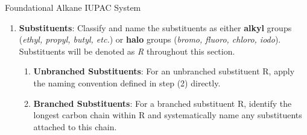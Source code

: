 \documentclass[10pt]{article}
\begin{document}
\begin{core}[label=core:alkane_iupac]{Foundational Alkane IUPAC System}
\begin{enumerate}[label=(\arabic*)]
          In \autoref{fig:iupac_1}, the longest chain contains 6 carbon atoms and is therefore designated \textbf{hexane}. Note that the left chain possesses more substituents than the right chain; consequently, the left chain is selected as the parent chain for nomenclature purposes.

          \item \textbf{Substituents}: Classify and name the substituents as either \textbf{alkyl} groups (\textit{ethyl, propyl, butyl, etc.}) or \textbf{halo} groups (\textit{bromo, fluoro, chloro, iodo}). Substituents will be denoted as \textit{R} throughout this section.

          \begin{enumerate}

            \item \textbf{Unbranched Substituents}: For an unbranched substituent R, apply the naming convention defined in step (2) directly.


            \item \textbf{Branched Substituents}: For a branched substituent R, identify the longest carbon chain within R and systematically name any substituents attached to this chain.



\end{enumerate}
\end{enumerate}
\end{core}
\end{document}
